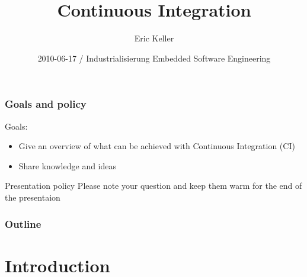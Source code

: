 \documentclass{beamer}
\title[Continuous Integration]{Continuous Integration}
\author{Eric Keller}
\institute[HAMILTON-Medical AG]
{
HAMILTON-Medical AG\\
Platform C
}
\date{2010-06-17 / Industrialisierung Embedded Software Engineering}
\begin{document}
\begin{frame}
\titlepage
\end{frame}

\begin{frame}
\frametitle{Goals and policy}
Goals:
\begin{itemize}
  \item Give an overview of what can be achieved with Continuous Integration
  (CI)
  \item Share knowledge and ideas
\end{itemize}

\begin{block}{Presentation policy}
   \alert{Please note your question and keep them warm for the end of the
   presentaion}
 \end{block}

\end{frame}



\begin{frame}
\frametitle{Outline}
\tableofcontents
\end{frame}


\section{Introduction}
\end{document}
